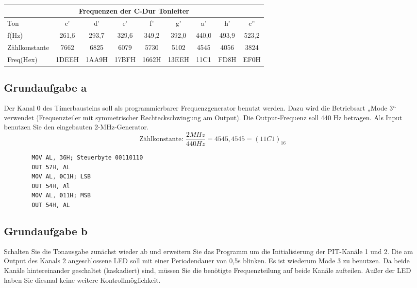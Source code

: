\documentclass[a4paper,10pt,titlepage]{scrartcl}
\begin{document}
\begin{center}
        \begin{tabular}{| l | c | c | c | c | c | c | c | c | }
                \hline
                \multicolumn{9}{|c|}{Frequenzen der C-Dur Tonleiter}                          \\
                \hline
                \hline
                Ton           & c'    & d'    & e'    & f'    & g'    & a'    & h'    & c''   \\\hline
                f(Hz)         & 261,6 & 293,7 & 329,6 & 349,2 & 392,0 & 440,0 & 493,9 & 523,2 \\\hline
                Zählkonstante & 7662  & 6825  & 6079  & 5730  & 5102  & 4545  & 4056  & 3824  \\\hline
                Freq(Hex)     & 1DEEH & 1AA9H & 17BFH & 1662H & 13EEH & 11C1  & FD8H  & EF0H  \\\hline
        \end{tabular}
\end{center}

\subsection*{Grundaufgabe a}
Der  Kanal  0  des  Timerbausteins  soll  als  programmierbarer  Frequenzgenerator  benutzt  werden.  Dazu  wird  die  Betriebsart  „Mode  3“  verwendet  (Frequenzteiler  mit  symmetrischer  Rechteckschwingung  am  Output).  Die  Output-Frequenz  soll  440  Hz  betragen. Als Input benutzen Sie den eingebauten 2-MHz-Generator.
$$\text{Zählkonstante: } \frac{2 MHz}{440 Hz} = 4545,4545 = (11C1)_{16}$$

\begin{lstlisting}
        MOV AL, 36H; Steuerbyte 00110110
        OUT 57H, AL
        MOV AL, 0C1H; LSB
        OUT 54H, Al
        MOV AL, 011H; MSB
        OUT 54H, AL
\end{lstlisting}

\subsection*{Grundaufgabe b}
Schalten  Sie  die  Tonausgabe  zunächst  wieder  ab  und  erweitern  Sie  das  Programm  um  die  Initialisierung der PIT-Kanäle 1 und 2. Die am Output des Kanals 2 angeschlossene LED soll mit  einer  Periodendauer  von  0,5s  blinken.  Es  ist  wiederum  Mode  3  zu  benutzen.  Da  beide  Kanäle hintereinander geschaltet (kaskadiert) sind, müssen Sie die benötigte Frequenzteilung auf beide Kanäle aufteilen. Außer der LED haben Sie diesmal keine weitere Kontrollmöglichkeit.
\end{document}
